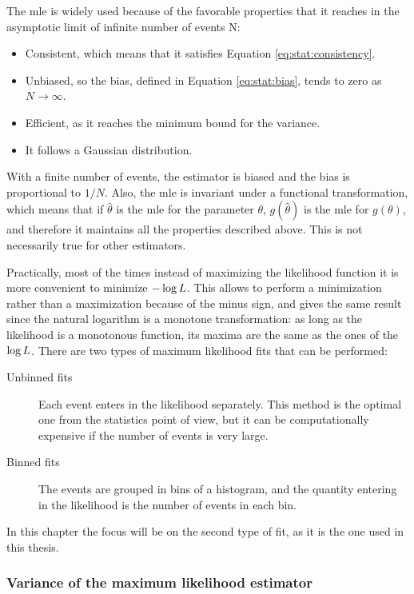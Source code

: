 The \gls{mle} is widely used because of the favorable properties that it reaches in the asymptotic limit of infinite number of events N:
\begin{itemize}
\item Consistent, which means that it satisfies Equation \ref{eq:stat:consistency}.
\item Unbiased, so the bias, defined in Equation \ref{eq:stat:bias}, tends to zero as $N \rightarrow \infty$.
\item Efficient, as it reaches the minimum bound for the variance.
\item It follows a Gaussian distribution.
\end{itemize}

\noindent With a finite number of events, the estimator is biased and the bias is proportional to $1/N$. Also, the \gls{mle} is invariant under a functional transformation, which means that if $\hat{\theta}$ is the \gls{mle} for the parameter $\theta$, $g(\hat{\theta})$ is the \gls{mle} for $g(\theta)$, and therefore it maintains all the properties described above. This is not necessarily true for other estimators.

Practically, most of the times instead of maximizing the likelihood function it is more convenient to minimize $-\log{L}$. 
This allows to perform a minimization rather than a maximization because of the minus sign,
and gives the same result since the natural logarithm is a monotone transformation: 
as long as the likelihood is a monotonous function, its maxima are the same as the ones of the $\log{L}$.
There are two types of maximum likelihood fits that can be performed:

\begin{description}
\item[Unbinned fits] Each event enters in the likelihood separately. This method is the optimal one from the statistics point of view, but it can be computationally expensive if the number of events is very large.
\item[Binned fits] The events are grouped in bins of a histogram, and the quantity entering in the likelihood is the number of events in each bin.
\end{description}

\noindent In this chapter the focus will be on the second type of fit, as it is the one used in this thesis.

\subsubsection*{Variance of the maximum likelihood estimator}

